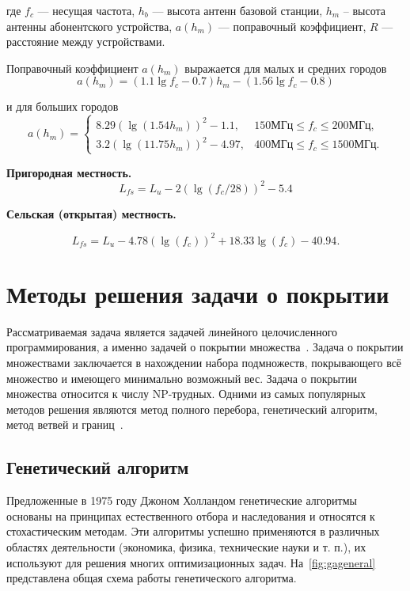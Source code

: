 где $f_c$ --- несущая частота, $h_b$ --- высота антенн базовой станции, $h_m$ – высота антенны абонентского устройства, $a(h_m)$ --- поправочный коэффициент, $R$ --- расстояние между устройствами.

Поправочный коэффициент $a(h_m)$ выражается для малых и средних городов
\begin{equation}
	a(h_m) = (1.1 \lg f_c - 0.7)h_m - (1.56 \lg f_c - 0.8)
\end{equation}

и для больших городов
\begin{equation}
	a(h_m) =
	\begin{cases}
		8.29(\lg (1.54h_m))^2 - 1.1, & 150\text{МГц} \le f_c \le 200\text{МГц},\\
		3.2(\lg (11.75h_m))^2 - 4.97,& 400\text{МГц} \le f_c \le 1500\text{МГц}.
	\end{cases}
\end{equation}

\textbf{Пригородная местность.}
\begin{equation}
	L_{fs} = L_u - 2(\lg(f_c/28))^2 - 5.4
\end{equation}

\textbf{Сельская (открытая) местность.}

\begin{equation}
	L_{fs} = L_u - 4.78(\lg(f_c))^2 + 18.33 \lg(f_c) - 40.94. 
\end{equation}



\section{Методы решения задачи о покрытии}

Рассматриваемая задача является задачей линейного целочисленного программирования, а именно задачей о покрытии множества~\cite{gen-hard}. Задача о покрытии множествами заключается в нахождении набора подмножеств, покрывающего всё множество и имеющего минимально 
возможный вес. Задача о покрытии множества относится к числу NP-трудных. Одними из самых популярных методов решения являются метод полного перебора, генетический алгоритм, метод ветвей и границ~\cite{method-compare}.


\subsection{Генетический алгоритм}

Предложенные в 1975 году Джоном Холландом генетические алгоритмы основаны на принципах естественного отбора и наследования и относятся к стохастическим методам. Эти алгоритмы успешно применяются в различных областях деятельности (экономика, физика, технические науки и т. п.), их используют для решения многих оптимизационных задач. На~\ref{fig:gageneral} представлена общая схема работы генетического алгоритма.

